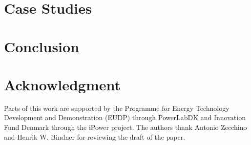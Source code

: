 \documentclass[review]{elsarticle}
\begin{document}
\section{Case Studies}\label{sec:casestudies}


\section{Conclusion}\label{sec:conclusion}


\section*{Acknowledgment}
Parts of this work are supported by the Programme for Energy Technology Development and Demonstration (EUDP) through PowerLabDK and Innovation Fund Denmark through the iPower project. The authors thank Antonio Zecchino and Henrik W. Bindner for reviewing the draft of the paper.




%
\end{document}

